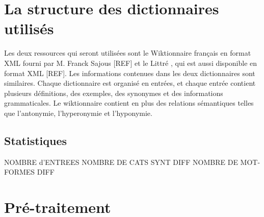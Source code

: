 \documentclass{article}
\begin{document}
\section{La structure des dictionnaires utilisés}

Les deux ressources qui seront utilisées sont le Wiktionnaire français en format XML fourni par M. Franck Sajous [REF] et le Littré , qui est aussi disponible en format XML [REF].
\newline
\newline
Les informations contenues dans les deux dictionnaires sont similaires. Chaque dictionnaire est organisé en entrées, et chaque entrée contient plusieurs définitions, des exemples, des synonymes et des informations grammaticales. Le wiktionnaire contient en plus des relations sémantiques telles que l'antonymie, l'hyperonymie et l’hyponymie.

\subsection{Statistiques}

NOMBRE d'ENTREES
NOMBRE DE CATS SYNT DIFF
NOMBRE DE MOT-FORMES DIFF

\section{Pré-traitement}
\end{document}
